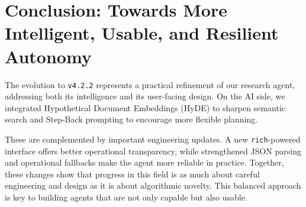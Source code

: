 \documentclass[12pt, a4paper]{article}
\begin{document}
\section{Conclusion: Towards More Intelligent, Usable, and Resilient Autonomy}

The evolution to \verb|v4.2.2| represents a practical refinement of our research agent, addressing both its intelligence and its user-facing design. On the AI side, we integrated Hypothetical Document Embeddings (HyDE) to sharpen semantic search and Step-Back prompting to encourage more flexible planning.

These are complemented by important engineering updates. A new \texttt{rich}-powered interface offers better operational transparency, while strengthened JSON parsing and operational fallbacks make the agent more reliable in practice. Together, these changes show that progress in this field is as much about careful engineering and design as it is about algorithmic novelty. This balanced approach is key to building agents that are not only capable but also usable.
\end{document}
